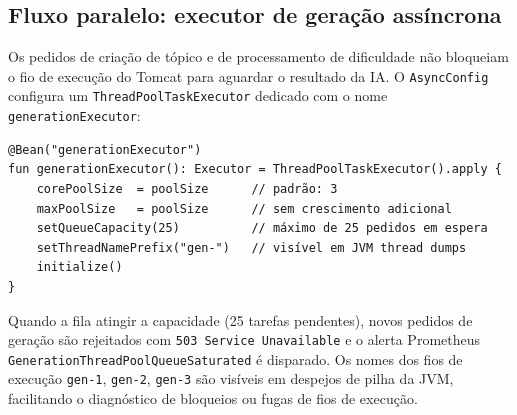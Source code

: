 \subsection*{Fluxo paralelo: executor de geração assíncrona}

Os pedidos de criação de tópico e de processamento de dificuldade não
bloqueiam o fio de execução do Tomcat para aguardar o resultado da IA.
O \texttt{AsyncConfig} configura um \texttt{ThreadPoolTaskExecutor}
dedicado com o nome \texttt{generationExecutor}:

\begin{verbatim}
@Bean("generationExecutor")
fun generationExecutor(): Executor = ThreadPoolTaskExecutor().apply {
    corePoolSize  = poolSize      // padrão: 3
    maxPoolSize   = poolSize      // sem crescimento adicional
    setQueueCapacity(25)          // máximo de 25 pedidos em espera
    setThreadNamePrefix("gen-")   // visível em JVM thread dumps
    initialize()
}
\end{verbatim}

Quando a fila atingir a capacidade (25 tarefas pendentes), novos pedidos
de geração são rejeitados com \texttt{503 Service Unavailable} e o alerta
Prometheus \texttt{GenerationThreadPoolQueueSaturated} é disparado.
Os nomes dos fios de execução \texttt{gen-1}, \texttt{gen-2}, \texttt{gen-3}
são visíveis em despejos de pilha da JVM, facilitando o diagnóstico de
bloqueios ou fugas de fios de execução.

